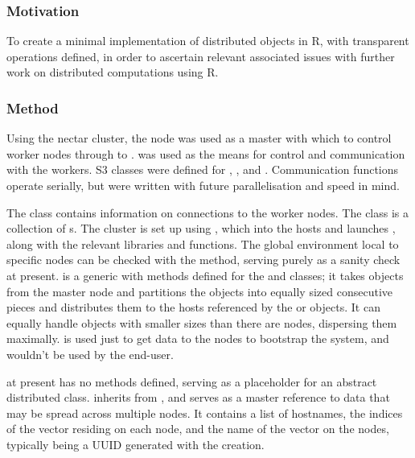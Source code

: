 \subsubsection{Motivation}\label{sec:ds-motivation}

To create a minimal implementation of distributed objects in R, with transparent operations defined, in order to ascertain relevant associated issues with further work on distributed computations using R.

\subsubsection{Method}\label{method}

Using the nectar cluster, the  node was used as a master with which to control worker nodes  through to .
 was used as the means for control and
communication with the workers.
S3 classes were defined for , ,  and .
Communication functions operate serially, but were written with future parallelisation and speed in mind.

The  class contains information on connections to the worker nodes.
The  class is a collection of s.
The cluster is set up using , which  into the hosts and launches , along with the relevant libraries and functions.
The global environment local to specific nodes can be checked with the  method, serving purely as a sanity check at present.
 is a generic with
methods defined for the  and  classes; it
takes objects from the master node and partitions the objects into
equally sized consecutive pieces and distributes them to the hosts
referenced by the  or  objects.
It can equally handle objects with smaller  sizes than there are nodes, dispersing them maximally.
 is used just to get
data to the nodes to bootstrap the system, and wouldn't be used by the
end-user.

 at present has no methods defined, serving
as a placeholder for an abstract distributed class.
 inherits from ,
and serves as a master reference to data that may be spread across
multiple nodes.
It contains a list of hostnames, the indices of the vector residing on each node, and the name of the vector on the nodes, typically being a UUID generated with the  creation.

